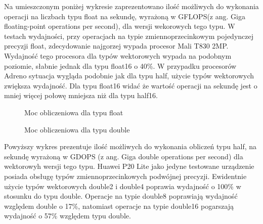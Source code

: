 Na umieszczonym poniżej wykresie zaprezentowano ilość możliwych do wykonania operacji na liczbach typu float na sekundę, wyrażoną w GFLOPS(z ang. Giga floating-point operations per second), dla wersji wekorowych tego typu. W testach wydajności, przy operacjach na typie zmiennoprzecinkowym pojedynczej precyzji float, zdecydowanie najgorzej wypada procesor Mali T830 2MP. Wydajność tego procesora dla typów wektorowych wypada na podobnym poziomie, słabnie jednak dla typu float16 o 40\%. W przypadku procesorów Adreno sytuacja wygląda podobnie jak dla typu half, użycie typów wektorowych zwiększa wydajność. Dla typu float16 widać że wartość operacji na sekundę jest o mniej więcej połowę mniejsza niż dla typu half16.
\begin{figure}[H]
\caption{Moc obliczeniowa dla typu float}
\end{figure}

\begin{figure}[H]
\caption{Moc obliczeniowa dla typu double}
\end{figure}
Powyższy wykres prezentuje ilość możliwych do wykonania obliczeń typu half, na sekundę wyrażoną w GDOPS (z ang. Giga double operations per second) dla wektorowyh wersji tego typu. Huawei P20 Lite jako jedyne testowane urządzenie posiada obsługę typów zmiennoprzecinkowych podwójnej precyzji. Ewidentnie użycie typów wektorowych double2 i double4 poprawia wydajność o 100\% w stosunku do typu double. Operacje na typie double8 poprawiają wydajność względem double o 17\%, natomiast operacje na typie double16 pogarszają wydajność o 57\% względem typu double.

